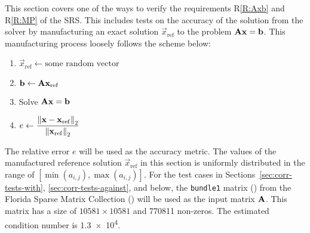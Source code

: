 \documentclass[12pt, titlepage]{article}
\newcommand{\rref}[1]{R\ref{#1}}
\begin{document}
This section covers one of the ways to verify the requirements \rref{R:Axb} and
\rref{R:MP} of the SRS. This includes tests on the accuracy of the solution from
the solver by manufacturing an exact solution \(\vec{x}_\mathrm{ref}\) to the
problem \(\mathbf{A}\mathbf{x} = \mathbf{b}\). This manufacturing process loosely
follows the scheme below:

\begin{enumerate}
\item \(\vec{x}_\mathrm{ref} \gets \text{some random vector}\)
\item \(\mathbf{b} \gets \mathbf{A} \mathbf{x}_\mathrm{ref} \)
\item Solve \(\mathbf{A}\mathbf{x} = \mathbf{b}\)
\item \(e \gets \displaystyle \frac{\left\lVert\mathbf{x} - \mathbf{x}_\mathrm{ref}\right\rVert_2}{\left\lVert\mathbf{x}_\mathrm{ref}\right\rVert_2}\)
\end{enumerate}

The relative error \(e\) will be used as the accuracy metric. The values of the
manufactured reference solution \(\vec{x}_\mathrm{ref}\) in this section is
uniformly distributed in the range of \([\min(a_{i,j}), \max(a_{i,j})]\). For
the test cases in Sections~\ref{sec:corr-tests-with},
\ref{sec:corr-tests-against}, and below, the \texttt{bundle1} matrix
(\cite{m_lourakis_lourakisbundle1_2006}) from the Florida Sparse Matrix
Collection (\cite{davis_university_2011}) will be used as the input matrix
\(\mathbf{A}\). This matrix has a size of \(\num{10581} \times \num{10581}\) and
\num{770811} non-zeros. The estimated condition number is \num{1.3e4}.
\end{document}
